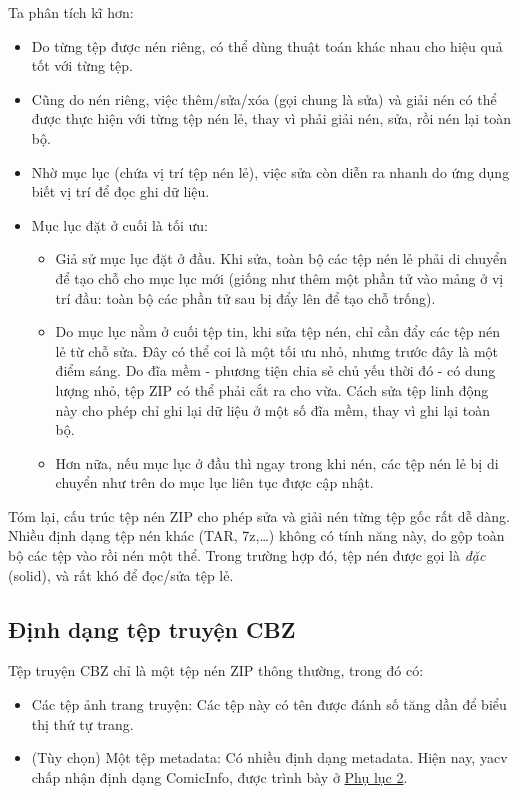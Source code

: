 \documentclass[../../thesis]{subfiles}
\begin{document}
Ta phân tích kĩ hơn:

\begin{itemize}
    \item
        Do từng tệp được nén riêng, có thể dùng thuật toán khác nhau cho hiệu
        quả tốt với từng tệp.
    \item
        Cũng do nén riêng, việc thêm/sửa/xóa (gọi chung là sửa) và giải nén có
        thể được thực hiện với từng tệp nén lẻ, thay vì phải giải nén, sửa, rồi
        nén lại toàn bộ.
    \item
        Nhờ mục lục (chứa vị trí tệp nén lẻ), việc sửa còn diễn ra nhanh do ứng
        dụng biết vị trí để đọc ghi dữ liệu.
    \item
        Mục lục đặt ở cuối là tối ưu:

        \begin{itemize}
            \item
                Giả sử mục lục đặt ở đầu. Khi sửa, toàn bộ các tệp nén lẻ phải
                di chuyển để tạo chỗ cho mục lục mới (giống như thêm một phần tử
                vào mảng ở vị trí đầu: toàn bộ các phần tử sau bị đẩy lên để tạo
                chỗ trống).
            \item
                Do mục lục nằm ở cuối tệp tin, khi sửa tệp nén, chỉ cần đẩy các
                tệp nén lẻ từ chỗ sửa. Đây có thể coi là một tối ưu nhỏ, nhưng
                trước đây là một điểm sáng. Do đĩa mềm - phương tiện chia sẻ chủ
                yếu thời đó - có dung lượng nhỏ, tệp ZIP có thể phải cắt ra cho
                vừa. Cách sửa tệp linh động này cho phép chỉ ghi lại dữ liệu ở
                một số đĩa mềm, thay vì ghi lại toàn bộ.
            \item
                Hơn nữa, nếu mục lục ở đầu thì ngay trong khi nén, các tệp nén
                lẻ bị di chuyển như trên do mục lục liên tục được cập nhật.
        \end{itemize}
\end{itemize}

Tóm lại, cấu trúc tệp nén ZIP cho phép sửa và giải nén từng tệp gốc rất dễ dàng.
Nhiều định dạng tệp nén khác (TAR, 7z,\ldots) không có tính năng này, do gộp
toàn bộ các tệp vào rồi nén một thể. Trong trường hợp đó, tệp nén được gọi là
\emph{đặc} (solid), và rất khó để đọc/sửa tệp lẻ.

\subsection{Định dạng tệp truyện CBZ}

Tệp truyện CBZ chỉ là một tệp nén ZIP thông thường, trong đó có:

\begin{itemize}
    \item
        Các tệp ảnh trang truyện: Các tệp này có tên được đánh số tăng dần để
        biểu thị thứ tự trang.
    \item
        (Tùy chọn) Một tệp metadata: Có nhiều định dạng metadata. Hiện nay, yacv
        chấp nhận định dạng ComicInfo, được trình bày ở
        \protect\hyperlink{P8.2-comicinfo.xsd}{Phụ lục 2}.
\end{itemize}
\end{document}
